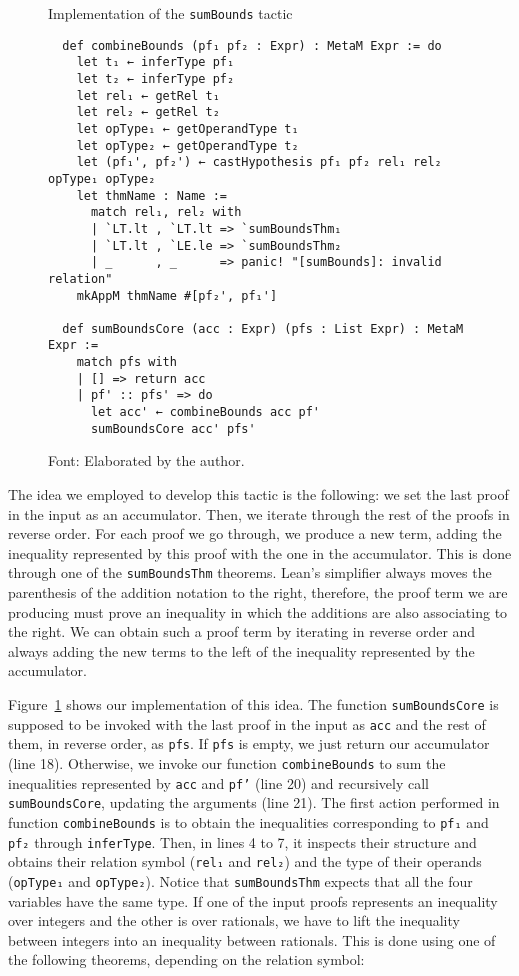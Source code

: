 \begin{figure}[t]
\caption{Implementation of the \texttt{sumBounds} tactic}\label{sumBoundsTac}
\begin{verbatim}
  def combineBounds (pf₁ pf₂ : Expr) : MetaM Expr := do
    let t₁ ← inferType pf₁
    let t₂ ← inferType pf₂
    let rel₁ ← getRel t₁
    let rel₂ ← getRel t₂
    let opType₁ ← getOperandType t₁
    let opType₂ ← getOperandType t₂
    let (pf₁', pf₂') ← castHypothesis pf₁ pf₂ rel₁ rel₂ opType₁ opType₂
    let thmName : Name :=
      match rel₁, rel₂ with
      | `LT.lt , `LT.lt => `sumBoundsThm₁
      | `LT.lt , `LE.le => `sumBoundsThm₂
      | _      , _      => panic! "[sumBounds]: invalid relation"
    mkAppM thmName #[pf₂', pf₁']

  def sumBoundsCore (acc : Expr) (pfs : List Expr) : MetaM Expr :=
    match pfs with
    | [] => return acc
    | pf' :: pfs' => do
      let acc' ← combineBounds acc pf'
      sumBoundsCore acc' pfs'
\end{verbatim}
\caption*{Font: Elaborated by the author.}
\end{figure}

The idea we employed to develop this tactic is the following: we set the last
proof in the input as an accumulator. Then, we iterate through the rest of the proofs
in reverse order. For each proof we go through, we produce a new term, adding the
inequality represented by this proof with the one in the accumulator. This is done
through one of the \texttt{sumBoundsThm} theorems. Lean's simplifier always
moves the parenthesis of the addition notation to the right, therefore,
the proof term we are producing must prove an inequality in which
the additions are also associating to the right.
We can obtain such a proof term by iterating
in reverse order and always adding the new terms to the left of the inequality
represented by the accumulator.


Figure~\ref{sumBoundsTac} shows our implementation of this idea. The function
\texttt{sumBoundsCore} is supposed to be invoked with the last proof in the input
as \texttt{acc} and the rest of them, in reverse order, as \texttt{pfs}.
If \texttt{pfs} is empty, we just return our accumulator (line 18). Otherwise, we
invoke our function \texttt{combineBounds} to sum the inequalities represented
by \texttt{acc} and \texttt{pf'} (line 20) and recursively call \texttt{sumBoundsCore},
updating the arguments (line 21). The first action performed in function \texttt{combineBounds} is to obtain the inequalities corresponding to \texttt{pf₁} and
\texttt{pf₂} through \texttt{inferType}. Then, in lines 4 to 7, it inspects their structure and
obtains their relation symbol (\texttt{rel₁} and \texttt{rel₂}) and the type of their
operands (\texttt{opType₁} and \texttt{opType₂}). Notice that \texttt{sumBoundsThm}
expects that all the four variables have the same type. If one of the input proofs
represents an inequality over integers and the other is over rationals, we
have to lift the inequality between integers into an inequality between rationals.
This is done using one of the following theorems, depending on the relation symbol:

